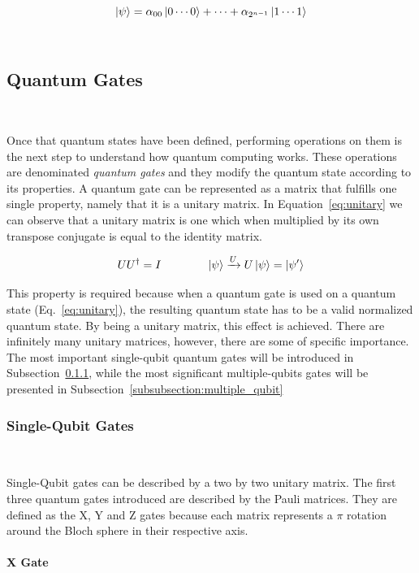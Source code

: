 \begin{equation}\label{eq:multiple_qubits}
  \ket{\psi} = \alpha_{00}\ket{0\cdots0} + \cdots + \alpha_{2^{n-1}}\ket{1\cdots1}
\end{equation} \

\subsection{Quantum Gates}\label{subsection:gates}\

Once that quantum states have been defined, performing operations
on them is the next step to understand how quantum computing works.
These operations are denominated \textit{quantum gates} and they
modify the quantum state according to its properties. A quantum gate
can be represented as a matrix that fulfills one single property,
namely that it is a unitary matrix. In Equation~\ref{eq:unitary} we
can observe that a unitary matrix is one which when multiplied by its
own transpose conjugate is equal to the identity matrix.

\begin{equation}\label{eq:unitary}
  UU^{\dag} = I \qquad \qquad
  \ket{\psi} \xrightarrow{U} U\ket{\psi} = \ket{\psi'}
\end{equation}

This property is required because when a quantum gate is used on a
quantum state (Eq.~\ref{eq:unitary}), the resulting quantum state has to be a valid normalized
quantum state. By being a unitary matrix, this effect is achieved.
There are infinitely many unitary matrices, however, there are some
of specific importance. The most important single-qubit quantum
gates will be introduced in Subsection~\ref{subsubsection:single_qubit},
while the most significant multiple-qubits gates will be presented
in Subsection~\ref{subsubsection:multiple_qubit} \

\subsubsection{Single-Qubit Gates}\label{subsubsection:single_qubit} \

Single-Qubit gates can be described by a two by two unitary matrix. The
first three quantum gates introduced are described by the Pauli matrices.
They are defined as the X, Y and Z gates because each matrix represents
a \(\pi\) rotation around the Bloch sphere in their respective axis. \

\paragraph{X Gate} \

